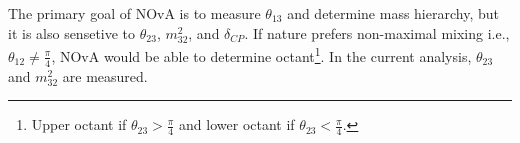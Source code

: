 The primary goal of NOvA is to measure $\theta_{13}$ and determine mass hierarchy, but it is also sensetive to $\theta_{23}$,
$m_{32}^2$, and $\delta_{CP}$. If nature prefers non-maximal mixing i.e., $\theta_{12} 
\neq \frac{\pi}{4}$, NOvA would be able to determine octant\footnote{Upper octant if $\theta_{23} > \frac{\pi}{4}$
and lower octant if $\theta_{23} < \frac{\pi}{4}$.}. In the current analysis, $\theta_{23}$ and 
$m_{32}^2$ are measured. 


